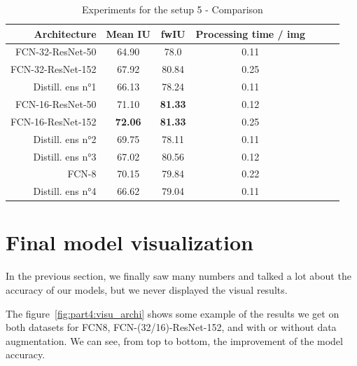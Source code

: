 \begin{table}[htbp]
  \centering
  
  \begin{tabular}{rcccccc}
  \rowcolor{gray!50}
  \toprule
  \textbf{Architecture} & \textbf{Mean IU} & \textbf{fwIU} & \textbf{Processing time / img}\\
  \midrule
  FCN-32-ResNet-50	& 64.90			& 78.0			& 0.11 \\
  FCN-32-ResNet-152	& 67.92			& 80.84			& 0.25 \\
  Distill. ens n°1	& 66.13			& 78.24			& 0.11 \\
  \midrule
  FCN-16-ResNet-50	& 71.10			& \textbf{81.33}	& 0.12 \\
  FCN-16-ResNet-152	& \textbf{72.06}	& \textbf{81.33}	& 0.25 \\
  Distill. ens n°2	& 69.75			& 78.11			& 0.11 \\
  \midrule
  Distill. ens n°3	& 67.02			& 80.56			& 0.12 \\
  \midrule
  FCN-8				& 70.15			& 79.84			& 0.22 \\
  Distill. ens n°4	& 66.62			& 79.04			& 0.11 \\
  \bottomrule
  \end{tabular}%
  \caption{Experiments for the setup 5 - Comparison}
  \label{part4:setup5:comp}

\end{table}%


\section{Final model visualization}
In the previous section, we finally saw many numbers and talked a lot about the accuracy of our models, but we never displayed the visual results.

The figure~\ref{fig:part4:visu_archi} shows some example of the results we get on both datasets for FCN8, FCN-(32/16)-ResNet-152, and with or without data augmentation. We can see, from top to bottom, the improvement of the model accuracy.

